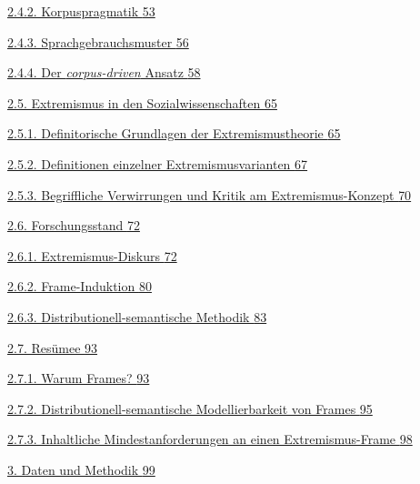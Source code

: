 \hyperref[korpuspragmatik]{2.4.2. Korpuspragmatik \hyperref[korpuspragmatik]{53}}

\hyperref[sprachgebrauchsmuster]{2.4.3. Sprachgebrauchsmuster \hyperref[sprachgebrauchsmuster]{56}}

\hyperref[der-corpus-driven-ansatz]{2.4.4. Der \emph{corpus-driven} Ansatz \hyperref[der-corpus-driven-ansatz]{58}}

\hyperref[extremismus-in-den-sozialwissenschaften]{2.5. Extremismus in den Sozialwissenschaften \hyperref[extremismus-in-den-sozialwissenschaften]{65}}

\hyperref[definitorische-grundlagen-der-extremismustheorie]{2.5.1. Definitorische Grundlagen der Extremismustheorie \hyperref[definitorische-grundlagen-der-extremismustheorie]{65}}

\hyperref[definitionen-einzelner-extremismusvarianten]{2.5.2. Definitionen einzelner Extremismusvarianten \hyperref[definitionen-einzelner-extremismusvarianten]{67}}

\hyperref[begriffliche-verwirrungen-und-kritik-am-extremismus-konzept]{2.5.3. Begriffliche Verwirrungen und Kritik am Extremismus-Konzept \hyperref[begriffliche-verwirrungen-und-kritik-am-extremismus-konzept]{70}}

\hyperref[forschungsstand]{2.6. Forschungsstand \hyperref[forschungsstand]{72}}

\hyperref[extremismus-diskurs]{2.6.1. Extremismus-Diskurs \hyperref[extremismus-diskurs]{72}}

\hyperref[frame-induktion]{2.6.2. Frame-Induktion \hyperref[frame-induktion]{80}}

\hyperref[distributionell-semantische-methodik]{2.6.3. Distributionell-semantische Methodik \hyperref[distributionell-semantische-methodik]{83}}

\hyperref[resuxfcmee]{2.7. Resümee \hyperref[resuxfcmee]{93}}

\hyperref[warum-frames]{2.7.1. Warum Frames? \hyperref[warum-frames]{93}}

\hyperref[distributionell-semantische-modellierbarkeit-von-frames]{2.7.2. Distributionell-semantische Modellierbarkeit von Frames \hyperref[distributionell-semantische-modellierbarkeit-von-frames]{95}}

\hyperref[inhaltliche-mindestanforderungen-an-einen-extremismus-frame]{2.7.3. Inhaltliche Mindestanforderungen an einen Extremismus-Frame \hyperref[inhaltliche-mindestanforderungen-an-einen-extremismus-frame]{98}}

\hyperref[daten-und-methodik]{3. Daten und Methodik \hyperref[daten-und-methodik]{99}}

